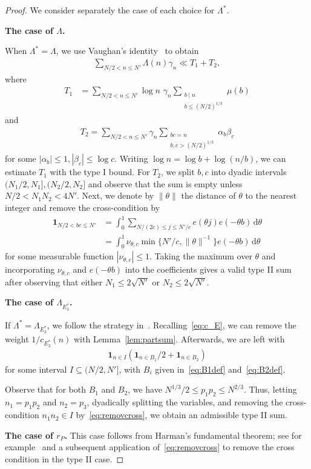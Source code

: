 \documentclass[12pt]{amsart}
\theoremstyle{definition}
\theoremstyle{remark}
\numberwithin{equation}{section}
\newcommand{\1}{\mathbf{1}}
\renewcommand\d{\,\mathrm{d}}
\begin{document}
\begin{proof}

We consider separately the case of each choice for $\Lambda^*$.

\textbf{The case of $\Lambda$.}

  When $\Lambda^*=\Lambda$, we use Vaughan's identity~\cite[Cor. 17.4]{cribro} to obtain
  \begin{align*}
      \sum_{N/2<n\leq N'} \Lambda(n) \gamma_n \ll T_1+T_2,
  \end{align*}
  where
  \begin{align*}
    T_1&= \sum_{N/2<n\leq N'} \log n \,\,\gamma_n \sum_{\substack{b\mid n\\ b\leq (N/2)^{1/3}}}\mu(b)
  \end{align*}
  and
  \begin{align*}
      T_2=\sum_{N/2<n\leq N'}\gamma_n \sum_{\substack{bc=n\\ b,c > (N/2)^{1/3} }}\alpha_b \beta_c
  \end{align*} 
  for some $|\alpha_b|\leq 1,|\beta_c|\leq \log c$. Writing $\log n=\log b+\log(n/b)$, we can estimate $T_1$ with the type I bound. For $T_2$, we split $b,c$ into dyadic intervals $(N_1/2,N_1],(N_2/2,N_2]$ and observe that the sum is empty unless $N/2<N_1 N_2<4N'$. Next, we denote by $ \|\theta\|$ the distance of $\theta$ to the nearest integer and remove the cross-condition by 
  \begin{align}
    \label{eq:removcross}  \1_{N/2 < bc \leq N'}&=\int_0^1 \sum_{N/(2 c) \leq j \leq N'/c}e(\theta j) e(-\theta b) \d \theta\\
      & \nonumber =\int_0^1 \nu_{\theta,c} \min\{N'/c, \|\theta\|^{-1}\} e(-\theta b) \d \theta
  \end{align}
for some measurable function $|\nu_{\theta,c}|\leq 1$. Taking the maximum over $\theta$ and incorporating $\nu_{\theta,c}$ and $e(-\theta b)$ into the coefficients gives a valid type II sum after observing that either $N_1\leq 2\sqrt{N'}$ or $N_2\leq 2\sqrt{N'}$. 


\textbf{The case of $\Lambda_{E_3^*}$.}

If $\Lambda^{*}=\Lambda_{E_3^*}$, we follow the strategy in~\cite[Sections 10.2, 10.3]{matomaki-shao}. Recalling~\eqref{eq:c_E}, we can remove the weight $1/c_{E_3^*}(n)$ with Lemma~\ref{lem:partsum}. Afterwards, we are left with 
  \begin{align*}
     \1_{n\in I}( \1_{n\in B_1}/2+\1_{n\in B_2})
  \end{align*}
 for some interval $I \subseteq (N/2,N']$, with $B_i$ given in~\eqref{eq:B1def} and~\eqref{eq:B2def}. 
  
Observe that for both $B_1$ and $B_2$, we have $N^{1/3}/2\leq p_1p_2\leq N^{2/3}$. Thus, letting $n_1=p_1p_2$ and $n_2=p_3$, dyadically splitting the variables, and removing the cross-condition $n_1n_2\in I$ by~\eqref{eq:removcross}, we obtain an admissible type II sum. 

\textbf{The case of $r_{P}$.}
This case follows from Harman's fundamental theorem; see for example~\cite[Theorem 3.1]{harman2007} and a subsequent application of~\eqref{eq:removcross} to remove the cross condition in the type II case.
\end{proof}
\end{document}
